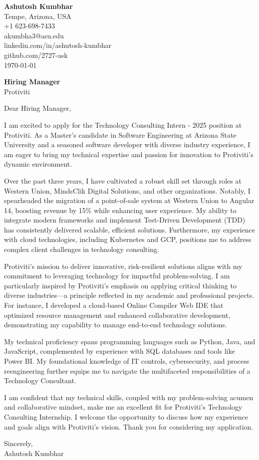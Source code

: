 \documentclass[11pt]{article}
\begin{document}
\begin{flushleft}
\textbf{Ashutosh Kumbhar} \\
Tempe, Arizona, USA \\
+1 623-698-7433 \\
akumbha3@asu.edu \\
linkedin.com/in/ashutosh-kumbhar \\
github.com/2727-ask \\
\today
\end{flushleft}

\vspace{0.5em}

\textbf{Hiring Manager} \\
Protiviti \\

\vspace{1em}

Dear Hiring Manager,

I am excited to apply for the Technology Consulting Intern - 2025 position at Protiviti. As a Master’s candidate in Software Engineering at Arizona State University and a seasoned software developer with diverse industry experience, I am eager to bring my technical expertise and passion for innovation to Protiviti’s dynamic environment.

Over the past three years, I have cultivated a robust skill set through roles at Western Union, MindsClik Digital Solutions, and other organizations. Notably, I spearheaded the migration of a point-of-sale system at Western Union to Angular 14, boosting revenue by 15\% while enhancing user experience. My ability to integrate modern frameworks and implement Test-Driven Development (TDD) has consistently delivered scalable, efficient solutions. Furthermore, my experience with cloud technologies, including Kubernetes and GCP, positions me to address complex client challenges in technology consulting.

Protiviti’s mission to deliver innovative, risk-resilient solutions aligns with my commitment to leveraging technology for impactful problem-solving. I am particularly inspired by Protiviti's emphasis on applying critical thinking to diverse industries—a principle reflected in my academic and professional projects. For instance, I developed a cloud-based Online Compiler Web IDE that optimized resource management and enhanced collaborative development, demonstrating my capability to manage end-to-end technology solutions.

My technical proficiency spans programming languages such as Python, Java, and JavaScript, complemented by experience with SQL databases and tools like Power BI. My foundational knowledge of IT controls, cybersecurity, and process reengineering further equips me to navigate the multifaceted responsibilities of a Technology Consultant.

I am confident that my technical skills, coupled with my problem-solving acumen and collaborative mindset, make me an excellent fit for Protiviti’s Technology Consulting Internship. I welcome the opportunity to discuss how my experience and goals align with Protiviti’s vision. Thank you for considering my application.

Sincerely, \\
Ashutosh Kumbhar
\end{document}
